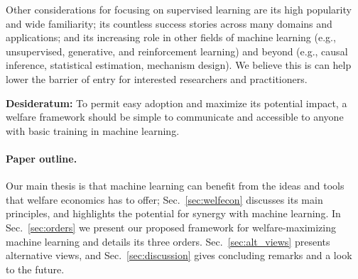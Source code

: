 {{%

}

Other considerations for focusing on supervised learning are its high popularity and wide familiarity;
its countless success stories across many domains and applications;
and its increasing role in other fields of machine learning
(e.g., unsupervised, generative, and reinforcement learning)
and beyond (e.g., causal inference, statistical estimation, mechanism design).
We believe this is can help lower the barrier of entry for interested researchers and practitioners.


\bbox
\textbf{Desideratum:} 
To permit easy adoption and maximize its potential impact,
a welfare framework should be simple to communicate and accessible to anyone 
with basic training in machine learning.
\ebox
}


\paragraph{Paper outline.}
Our main thesis is that machine learning can benefit from the ideas and tools that welfare economics has to offer;
Sec.~\ref{sec:welfecon} discusses
its main principles,
and highlights the potential for synergy with machine learning.
In Sec.~\ref{sec:orders} we present
our proposed framework for welfare-maximizing machine learning and details its three orders.%
Sec.~\ref{sec:alt_views} presents alternative views,
and Sec.~\ref{sec:discussion} gives concluding remarks and a look to the future.

